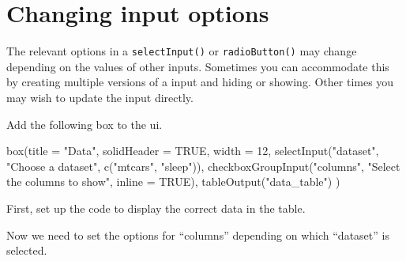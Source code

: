 \documentclass[
]{book}
\newenvironment{Shaded}{\begin{snugshade}}{\end{snugshade}}
\newcommand{\AttributeTok}[1]{\textcolor[rgb]{0.77,0.63,0.00}{#1}}
\newcommand{\ConstantTok}[1]{\textcolor[rgb]{0.00,0.00,0.00}{#1}}
\newcommand{\ControlFlowTok}[1]{\textcolor[rgb]{0.13,0.29,0.53}{\textbf{#1}}}
\newcommand{\DecValTok}[1]{\textcolor[rgb]{0.00,0.00,0.81}{#1}}
\newcommand{\FunctionTok}[1]{\textcolor[rgb]{0.00,0.00,0.00}{#1}}
\newcommand{\NormalTok}[1]{#1}
\newcommand{\OtherTok}[1]{\textcolor[rgb]{0.56,0.35,0.01}{#1}}
\newcommand{\SpecialCharTok}[1]{\textcolor[rgb]{0.00,0.00,0.00}{#1}}
\newcommand{\StringTok}[1]{\textcolor[rgb]{0.31,0.60,0.02}{#1}}
\begin{document}
\hypertarget{changing-input-options}{%
\section{Changing input options}\label{changing-input-options}}

The relevant options in a \texttt{selectInput()} or \texttt{radioButton()} may change depending on the values of other inputs. Sometimes you can accommodate this by creating multiple versions of a input and hiding or showing. Other times you may wish to update the input directly.

Add the following box to the ui.

\begin{Shaded}
\begin{Highlighting}[]
\FunctionTok{box}\NormalTok{(}\AttributeTok{title =} \StringTok{"Data"}\NormalTok{, }\AttributeTok{solidHeader =} \ConstantTok{TRUE}\NormalTok{, }\AttributeTok{width =} \DecValTok{12}\NormalTok{,}
  \FunctionTok{selectInput}\NormalTok{(}\StringTok{"dataset"}\NormalTok{, }\StringTok{"Choose a dataset"}\NormalTok{, }\FunctionTok{c}\NormalTok{(}\StringTok{"mtcars"}\NormalTok{, }\StringTok{"sleep"}\NormalTok{)),}
  \FunctionTok{checkboxGroupInput}\NormalTok{(}\StringTok{"columns"}\NormalTok{, }\StringTok{"Select the columns to show"}\NormalTok{, }\AttributeTok{inline =} \ConstantTok{TRUE}\NormalTok{),}
  \FunctionTok{tableOutput}\NormalTok{(}\StringTok{"data\_table"}\NormalTok{)}
\NormalTok{)}
\end{Highlighting}
\end{Shaded}

First, set up the code to display the correct data in the table.

\begin{Shaded}
\end{Shaded}

Now we need to set the options for ``columns'' depending on which ``dataset'' is selected.
\end{document}
